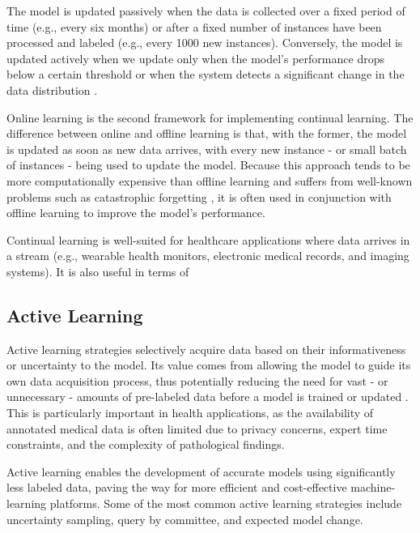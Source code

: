 \documentclass[../main.tex]{subfiles}
\begin{document}
     The model is updated passively when the data is collected over a fixed period of time (e.g., every six months) or after a fixed number of instances have been processed and labeled (e.g., every 1000 new instances). Conversely, the model is updated actively when we update only when the model's performance drops below a certain threshold or when the system detects a significant change in the data distribution \cite{huyen_designing_2022}.

    Online learning is the second framework for implementing continual learning. The difference between online and offline learning is that, with the former, the model is updated as soon as new data arrives, with every new instance - or small batch of instances - being used to update the model. Because this approach tends to be more computationally expensive than offline learning and suffers from well-known problems such as catastrophic forgetting \cite{huyen_designing_2022}, it is often used in conjunction with offline learning to improve the model's performance. 

    Continual learning is well-suited for healthcare applications where data arrives in a stream (e.g., wearable health monitors, electronic medical records, and imaging systems). It is also useful in terms of 


    \subsection{Active Learning} \label{sec:active_learning} 
 
     Active learning strategies selectively acquire data based on their informativeness or uncertainty to the model. Its value comes from allowing the model to guide its own data acquisition process, thus potentially reducing the need for vast - or unnecessary - amounts of pre-labeled data before a model is trained or updated \cite{huyen_designing_2022, chen_study_2015, figueroa_predicting_2012}. 
     This is particularly important in health applications, as the availability of annotated medical data is often limited due to privacy concerns, expert time constraints, and the complexity of pathological findings.
     
     Active learning enables the development of accurate models using significantly less labeled data, paving the way for more efficient and cost-effective machine-learning platforms. Some of the most common active learning strategies include uncertainty sampling, query by committee, and expected model change. 
\end{document}
